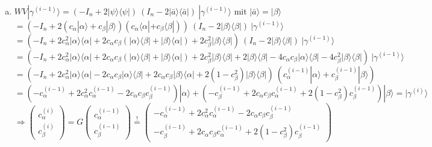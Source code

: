 \documentclass[a4paper]{scrartcl}
\begin{document}
\begin{enumerate}[a)]
\item $WV | \gamma^{(i-1)} \rangle = (-I_n +2 |\psi \rangle \langle \psi | ) ~ (I_n - 2 |\bar{a} \rangle \langle \bar{a}| ) ~ | \gamma^{(i-1)} \rangle$ mit $|\bar{a} \rangle = |\beta \rangle$\\
$= (-I_n +2 (c_{\alpha} |\alpha \rangle + c_{\beta} |\beta \rangle) (c_{\alpha} \langle \alpha| + c_{\beta} \langle \beta|) ) ~ (I_n - 2 | \beta \rangle \langle \beta| ) ~ | \gamma^{(i-1)} \rangle$\\
$= (-I_n +2 c_{\alpha}^2 |\alpha \rangle \langle \alpha| + 2 c_{\alpha} c_{\beta} ( |\alpha \rangle \langle \beta| + |\beta \rangle \langle \alpha|) + 2 c_{\beta}^2 |\beta \rangle \langle \beta| ) ~ (I_n - 2 | \beta \rangle \langle \beta| ) ~ | \gamma^{(i-1)} \rangle$\\
$= (-I_n +2 c_{\alpha}^2 |\alpha \rangle \langle \alpha| + 2c_{\alpha}c_{\beta} ( |\alpha \rangle \langle \beta| + |\beta \rangle \langle \alpha|) + 2c_{\beta}^2 |\beta \rangle \langle \beta| + 2 | \beta \rangle \langle \beta| - 4 c_{\alpha}c_{\beta} |\alpha \rangle \langle \beta| - 4 c_{\beta}^2 |\beta \rangle \langle \beta| ) ~ | \gamma^{(i-1)} \rangle$\\
$= (- I_n + 2 c_{\alpha}^2 |\alpha \rangle \langle \alpha| - 2 c_{\alpha}c_{\beta} |\alpha \rangle \langle \beta| + 2 c_{\alpha}c_{\beta} |\beta \rangle \langle \alpha| + 2(1 - c_{\beta}^2) |\beta \rangle \langle \beta|) ~ (c_{\alpha}^{(i-1)} |\alpha \rangle + c_{\beta}^{(i-1)} |\beta \rangle)$\\
$= (-c_{\alpha}^{(i-1)} + 2c_{\alpha}^2 c_{\alpha}^{(i-1)} - 2c_{\alpha}c_{\beta} c_{\beta}^{(i-1)}) |\alpha \rangle + (-c_{\beta}^{(i-1)} + 2c_{\alpha}c_{\beta} c_{\alpha}^{(i-1)} + 2(1 - c_{\beta}^2) c_{\beta}^{(i-1)} ) |\beta \rangle = | \gamma^{(i)} \rangle$\\

$\Rightarrow  \begin{pmatrix} c_{\alpha}^{(i)}\\ c_{\beta}^{(i)}\end{pmatrix} = G \begin{pmatrix} c_{\alpha}^{(i-1)}\\ c_{\beta}^{(i-1)}\end{pmatrix} \stackrel{!}{=} \begin{pmatrix}-c_{\alpha}^{(i-1)} + 2c_{\alpha}^2 c_{\alpha}^{(i-1)} - 2c_{\alpha}c_{\beta} c_{\beta}^{(i-1)} \\ -c_{\beta}^{(i-1)} + 2c_{\alpha}c_{\beta} c_{\alpha}^{(i-1)} + 2(1 - c_{\beta}^2) c_{\beta}^{(i-1)} \end{pmatrix}$\\


\end{enumerate}
\end{document}
